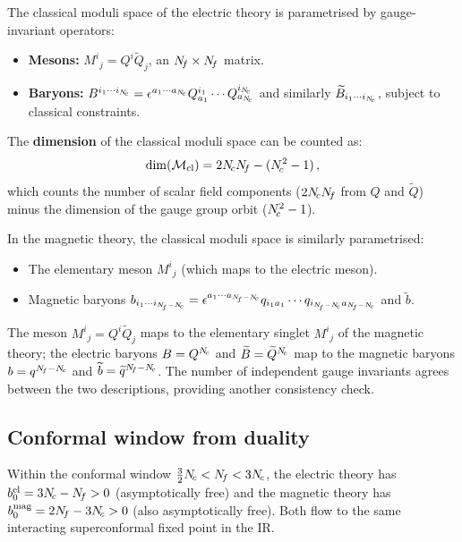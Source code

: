 \documentclass[11pt,a4paper]{article}
\begin{document}
The classical moduli space of the electric theory is parametrised by
gauge-invariant operators:
\begin{itemize}
  \item \textbf{Mesons:} $M^i{}_j = Q^i \widetilde{Q}_j$, an
    $N_{\!f} \times N_{\!f}$ matrix.
  \item \textbf{Baryons:}
    $B^{i_1 \cdots i_{N_{\!c}}} = \epsilon^{a_1 \cdots a_{N_{\!c}}}
    Q^{i_1}_{a_1} \cdots Q^{i_{N_{\!c}}}_{a_{N_{\!c}}}$ and similarly
    $\widetilde{B}_{i_1 \cdots i_{N_{\!c}}}$, subject to classical constraints.
\end{itemize}

The \textbf{dimension} of the classical moduli space can be counted as:
\begin{equation}\label{eq:moduli-dim}
  \dim(\mathcal{M}_{\text{cl}})
  = 2N_{\!c}N_{\!f} - (N_{\!c}^2 - 1)\,,
\end{equation}
which counts the number of scalar field components ($2N_{\!c}N_{\!f}$ from $Q$ and
$\widetilde{Q}$) minus the dimension of the gauge group orbit ($N_{\!c}^2 - 1$).

In the magnetic theory, the classical moduli space is similarly parametrised:
\begin{itemize}
  \item The elementary meson $M^i{}_j$ (which maps to the electric meson).
  \item Magnetic baryons $b_{i_1 \cdots i_{\Nf - \Nc}} =
    \epsilon^{a_1 \cdots a_{\Nf - \Nc}} q_{i_1 a_1} \cdots
    q_{i_{\Nf - \Nc} a_{\Nf - \Nc}}$ and $\widetilde{b}$.
\end{itemize}
The meson $M^i{}_j = Q^i \widetilde{Q}_j$ maps to the elementary singlet
$M^i{}_j$ of the magnetic theory; the electric baryons
$B = Q^{N_{\!c}}$ and $\widetilde{B} = \widetilde{Q}^{N_{\!c}}$ map to the
magnetic baryons $b = q^{N_{\!f} - N_{\!c}}$ and
$\widetilde{b} = \widetilde{q}^{N_{\!f} - N_{\!c}}$.
The number of independent gauge invariants agrees between the two descriptions,
providing another consistency check.

\subsection{Conformal window from duality}

Within the conformal window $\tfrac{3}{2}N_{\!c} < N_{\!f} < 3N_{\!c}$, the electric theory
has $b_0^{\text{el}} = 3N_{\!c} - N_{\!f} > 0$ (asymptotically free) and the magnetic
theory has $b_0^{\text{mag}} = 2N_{\!f} - 3N_{\!c} > 0$ (also asymptotically free).
Both flow to the same interacting superconformal fixed point in the IR.
\end{document}
